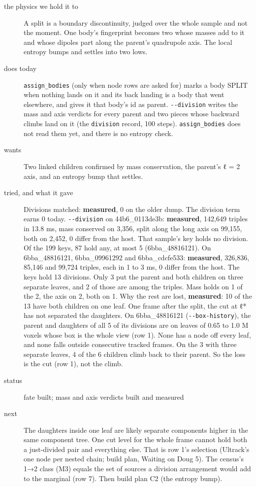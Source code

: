 \begin{description}
\item[{the physics we hold it to}] A split is a boundary discontinuity, judged over the whole sample and not the moment. One body's fingerprint becomes two whose masses add to it and whose dipoles part along the parent's quadrupole axis. The local entropy bumps and settles into two lows.
\item[{does today}] \texttt{assign\_\allowbreak{}bodies} (only when node rows are asked for) marks a body SPLIT when nothing lands on it and its back landing is a body that went elsewhere, and gives it that body's id as parent. \texttt{-\allowbreak{}-\allowbreak{}division} writes the mass and axis verdicts for every parent and two pieces whose backward climbs land on it (the \texttt{division} record, 100 steps). \texttt{assign\_\allowbreak{}bodies} does not read them yet, and there is no entropy check.
\item[{wants}] Two linked children confirmed by mass conservation, the parent's ℓ = 2 axis, and an entropy bump that settles.
\item[{tried, and what it gave}] Divisions matched: \textbf{measured}, 0 on the older dump. The division term earns 0 today. \texttt{-\allowbreak{}-\allowbreak{}division} on 44b6\_\allowbreak{}0113de3b: \textbf{measured}, 142,649 triples in 13.8 ms, mass conserved on 3,356, split along the long axis on 99,155, both on 2,452, 0 differ from the host. That sample's key holds no division. Of the 199 keys, 87 hold any, at most 5 (6bba\_\allowbreak{}48816121). On 6bba\_\allowbreak{}48816121, 6bba\_\allowbreak{}09961292 and 6bba\_\allowbreak{}cdcfe533: \textbf{measured}, 326,836, 85,146 and 99,724 triples, each in 1 to 3 ms, 0 differ from the host. The keys hold 13 divisions. Only 3 put the parent and both children on three separate leaves, and 2 of those are among the triples. Mass holds on 1 of the 2, the axis on 2, both on 1. Why the rest are lost, \textbf{measured}: 10 of the 13 have both children on one leaf. One frame after the split, the cut at ℓ* has not separated the daughters. On 6bba\_\allowbreak{}48816121 (\texttt{-\allowbreak{}-\allowbreak{}box-\allowbreak{}history}), the parent and daughters of all 5 of its divisions are on leaves of 0.65 to 1.0 M voxels whose box is the whole view (row 1). None has a node off every leaf, and none falls outside consecutive tracked frames. On the 3 with three separate leaves, 4 of the 6 children climb back to their parent. So the loss is the cut (row 1), not the climb.
\item[{status}] fate built; mass and axis verdicts built and measured
\item[{next}] The daughters inside one leaf are likely separate components higher in the same component tree. One cut level for the whole frame cannot hold both a just-divided pair and everything else. That is row 1's selection (Ultrack's one node per nested chain; build plan, Waiting on Doug 5). The census's 1→2 class (M3) equals the set of sources a division arrangement would add to the marginal (row 7). Then build plan C2 (the entropy bump).
\end{description}

